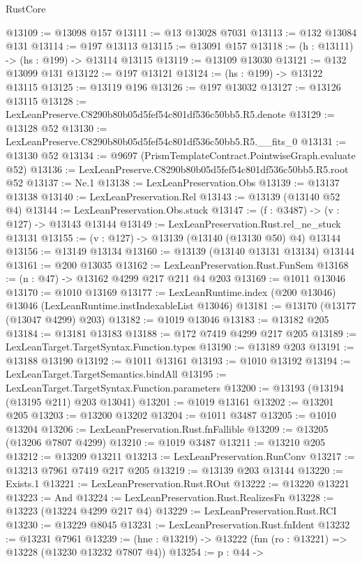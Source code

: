 \begin{lexlean}{RustCore}
\begin{coremodule}
@13109 := @13098 @157
@13111 := @13 @13028 @7031
@13113 := @132 @13084 @131
@13114 := @197 @13113
@13115 := @13091 @157
@13118 := (h : @13111) -> (hs : @199) -> @13114 @13115
@13119 := @13109 @13030
@13121 := @132 @13099 @131
@13122 := @197 @13121
@13124 := (hs : @199) -> @13122 @13115
@13125 := @13119 @196
@13126 := @197 @13032
@13127 := @13126 @13115
@13128 := LexLeanPreserve.C8290b80b05d5fef54c801df536c50bb5.R5.denote
@13129 := @13128 @52
@13130 := LexLeanPreserve.C8290b80b05d5fef54c801df536c50bb5.R5.__fits_0
@13131 := @13130 @52
@13134 := @9697 (PrismTemplateContract.PointwiseGraph.evaluate @52)
@13136 := LexLeanPreserve.C8290b80b05d5fef54c801df536c50bb5.R5.root @52
@13137 := Ne.{1}
@13138 := LexLeanPreservation.Obs
@13139 := @13137 @13138
@13140 := LexLeanPreservation.Rel
@13143 := @13139 (@13140 @52 @4)
@13144 := LexLeanPreservation.Obs.stuck
@13147 := (f : @3487) -> (v : @127) -> @13143 @13144
@13149 := LexLeanPreservation.Rust.rel_ne_stuck @13131
@13155 := (v : @127) -> @13139 (@13140 (@13130 @50) @4) @13144
@13156 := @13149 @13134
@13160 := @13139 (@13140 @13131 @13134) @13144
@13161 := @200 @13035
@13162 := LexLeanPreservation.Rust.FunSem
@13168 := (n : @47) -> @13162 @4299 @217 @211 @4 @203
@13169 := @1011 @13046
@13170 := @1010 @13169
@13177 := LexLeanRuntime.index (@200 @13046) @13046 (LexLeanRuntime.instIndexableList @13046)
@13181 := @13170 (@13177 (@13047 @4299) @203)
@13182 := @1019 @13046
@13183 := @13182 @205
@13184 := @13181 @13183
@13188 := @172 @7419 @4299 @217 @205
@13189 := LexLeanTarget.TargetSyntax.Function.types
@13190 := @13189 @203
@13191 := @13188 @13190
@13192 := @1011 @13161
@13193 := @1010 @13192
@13194 := LexLeanTarget.TargetSemantics.bindAll
@13195 := LexLeanTarget.TargetSyntax.Function.parameters
@13200 := @13193 (@13194 (@13195 @211) @203 @13041)
@13201 := @1019 @13161
@13202 := @13201 @205
@13203 := @13200 @13202
@13204 := @1011 @3487
@13205 := @1010 @13204
@13206 := LexLeanPreservation.Rust.fnFallible
@13209 := @13205 (@13206 @7807 @4299)
@13210 := @1019 @3487
@13211 := @13210 @205
@13212 := @13209 @13211
@13213 := LexLeanPreservation.RunConv
@13217 := @13213 @7961 @7419 @217 @205
@13219 := @13139 @203 @13144
@13220 := Exists.{1}
@13221 := LexLeanPreservation.Rust.ROut
@13222 := @13220 @13221
@13223 := And
@13224 := LexLeanPreservation.Rust.RealizesFn
@13228 := @13223 (@13224 @4299 @217 @4)
@13229 := LexLeanPreservation.Rust.RCI
@13230 := @13229 @8045
@13231 := LexLeanPreservation.Rust.fnIdent
@13232 := @13231 @7961
@13239 := (hne : @13219) -> @13222 (fun (ro : @13221) => @13228 (@13230 @13232 @7807 @4))
@13254 := {p : @44} ->

\end{coremodule}
\end{lexlean}
